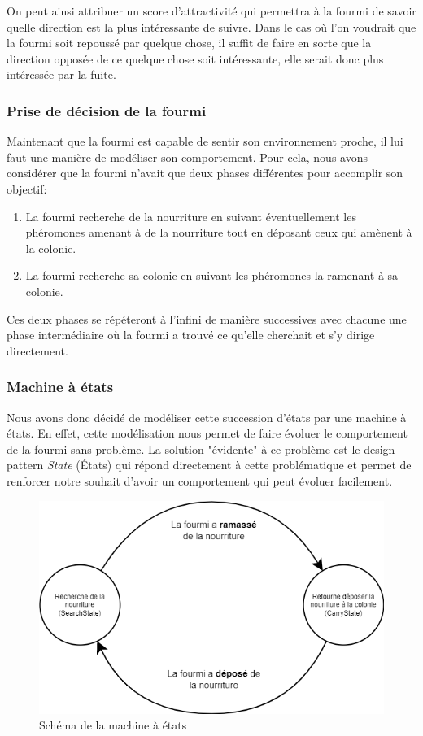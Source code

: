 \documentclass{EPUProjetDi}
\begin{document}
On peut ainsi attribuer un score d'attractivité qui permettra à la fourmi de savoir quelle direction est la plus intéressante de suivre.
Dans le cas où l'on voudrait que la fourmi soit repoussé par quelque chose, il suffit de faire en sorte que la direction opposée de ce quelque chose
soit intéressante, elle serait donc plus intéressée par la fuite. 

\subsubsection{Prise de décision de la fourmi}

Maintenant que la fourmi est capable de sentir son environnement proche, il lui faut une manière de modéliser son comportement.
Pour cela, nous avons considérer que la fourmi n'avait que deux phases différentes pour accomplir son objectif:
\begin{enumerate}
    \item La fourmi recherche de la nourriture en suivant éventuellement les phéromones amenant à de la nourriture tout en déposant ceux qui amènent à la colonie.
    \item La fourmi recherche sa colonie en suivant les phéromones la ramenant à sa colonie.
\end{enumerate}

Ces deux phases se répéteront à l'infini de manière successives avec chacune une phase intermédiaire où la fourmi a trouvé ce qu'elle cherchait
et s'y dirige directement. 

\pagebreak

\subsubsection{Machine à états}

Nous avons donc décidé de modéliser cette succession d'états par une machine à états. En effet, cette modélisation nous permet de faire évoluer 
le comportement de la fourmi sans problème. La solution "évidente" à ce problème est le design pattern \textit{State} (États) qui répond
directement à cette problématique et permet de renforcer notre souhait d'avoir un comportement qui peut évoluer facilement.

\begin{figure}[h]
    \centering
    \includegraphics[scale=0.4]{statemachine.png}
    \caption{Schéma de la machine à états}
    \label{fig:state_machine}
\end{figure}
\end{document}
